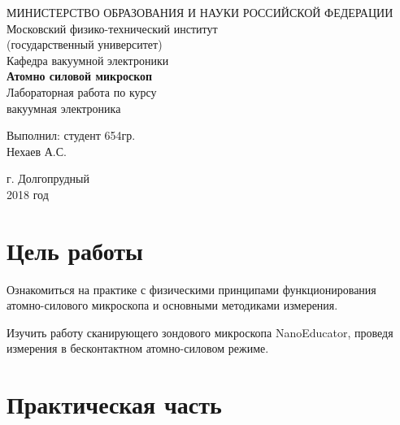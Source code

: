 \documentclass[a4paper, 12pt]{article}
\begin{document}
	\begin{titlepage}
		\begin{center}
		МИНИСТЕРСТВО ОБРАЗОВАНИЯ И НАУКИ РОССИЙСКОЙ ФЕДЕРАЦИИ\\
		\footnotesize{Московский физико-технический институт}\\
		\footnotesize{(государственный университет)}\\
		\footnotesize{Кафедра вакуумной электроники}\\
		\vfill
		{\LARGE
		\textbf{Атомно силовой микроскоп}\\
		}
		\vspace{1cm}
		Лабораторная работа по курсу\\
		вакуумная электроника
		\vfill
		\begin{flushright}
			Выполнил: студент 654гр.\\
			Нехаев А.С.
		\end{flushright}
		\vfill
		г. Долгопрудный\\
		2018 год
		\end{center}
	\end{titlepage}
	\newpage
	\tableofcontents
	\newpage
	\section{Цель работы}
	Ознакомиться на практике с физическими принципами функционирования атомно-силового микроскопа и основными методиками измерения.\par
	Изучить работу сканирующего зондового микроскопа NanoEducator, проведя измерения в бесконтактном атомно-силовом режиме.\par
	\newpage
	\section{Практическая часть}
\end{document}
